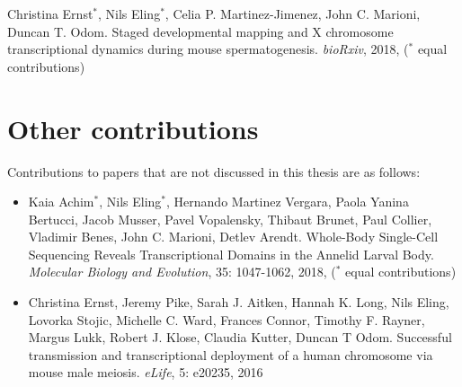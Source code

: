 Christina Ernst$^\ast$, Nils Eling$^\ast$, Celia P. Martinez-Jimenez, John C. Marioni, Duncan T. Odom. Staged developmental mapping and X chromosome transcriptional dynamics during mouse spermatogenesis. \emph{bioRxiv}, 2018, ($^\ast$ equal contributions)

\newpage

\section{Other contributions}

Contributions to papers that are not discussed in this thesis are as follows:

\begin{itemize}
\item Kaia Achim$^\ast$, Nils Eling$^\ast$, Hernando Martinez Vergara, Paola Yanina Bertucci, Jacob Musser, Pavel Vopalensky, Thibaut Brunet, Paul Collier, Vladimir Benes, John C. Marioni, Detlev Arendt. Whole-Body Single-Cell Sequencing Reveals Transcriptional Domains in the Annelid Larval Body. \emph{Molecular Biology and Evolution}, 35: 1047-1062, 2018, ($^\ast$ equal contributions)\\
\item Christina Ernst, Jeremy Pike, Sarah J. Aitken, Hannah K. Long, Nils Eling, Lovorka Stojic, Michelle C. Ward, Frances Connor, Timothy F. Rayner, Margus Lukk, Robert J. Klose, Claudia Kutter, Duncan T Odom. Successful transmission and transcriptional deployment of a human chromosome via mouse male meiosis. \emph{eLife}, 5: e20235, 2016 
\end{itemize}